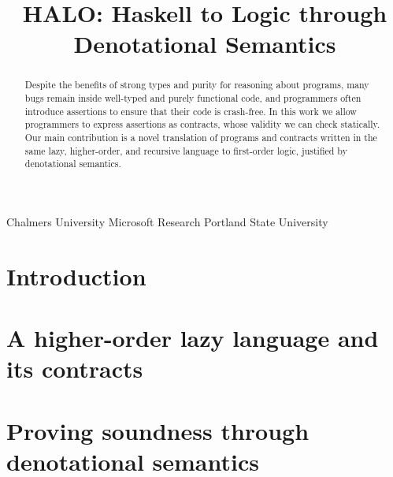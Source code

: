 \documentclass[preprint,nocopyrightspace,draft]{sigplanconf}
\begin{document}
\renewcommand{\Th}{{\cal T}}

\title{HALO: Haskell to Logic through Denotational Semantics}

           {Chalmers University}{}
           {Microsoft Research}{}
           {Portland State University}{}
\maketitle
\makeatactive

\begin{abstract}
Despite the benefits of strong types and purity for reasoning about
programs, many bugs remain inside well-typed and purely functional
code, and programmers often introduce assertions to ensure that their
code is crash-free.  In this work we allow programmers to express
assertions as contracts, whose validity we can check statically.  Our main
contribution is a novel translation of programs and contracts written in
the same lazy, higher-order, and recursive language to first-order
logic, justified by denotational semantics.
\end{abstract}



\section{Introduction}\label{s:intro}
  

%   

\section{A higher-order lazy language and its contracts}\label{sect:language}
  

\section{Proving soundness through denotational semantics}
   \label{sect:contracts}\label{ssect:denot}
  
\end{document}
